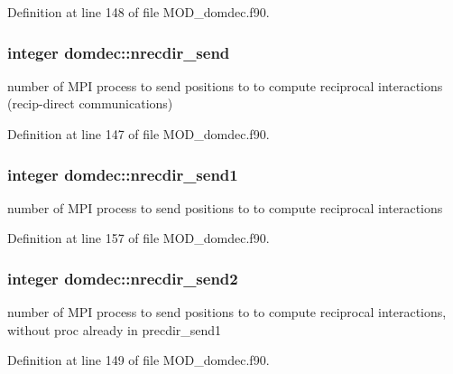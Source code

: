 Definition at line 148 of file M\-O\-D\-\_\-domdec.\-f90.

\hypertarget{classdomdec_ae3f9a9d0cf25f3d07550dd79ad9c84f8}{
\subsubsection[{nrecdir\-\_\-send}]{\setlength{\rightskip}{0pt plus 5cm}integer domdec\-::nrecdir\-\_\-send}}\label{classdomdec_ae3f9a9d0cf25f3d07550dd79ad9c84f8}


number of M\-P\-I process to send positions to to compute reciprocal interactions (recip-\/direct communications) 



Definition at line 147 of file M\-O\-D\-\_\-domdec.\-f90.

\hypertarget{classdomdec_a4dffa155fb7b24a0e90c0c94e7d4fdeb}{
\subsubsection[{nrecdir\-\_\-send1}]{\setlength{\rightskip}{0pt plus 5cm}integer domdec\-::nrecdir\-\_\-send1}}\label{classdomdec_a4dffa155fb7b24a0e90c0c94e7d4fdeb}


number of M\-P\-I process to send positions to to compute reciprocal interactions 



Definition at line 157 of file M\-O\-D\-\_\-domdec.\-f90.

\hypertarget{classdomdec_a399f832dbe50a87ea3cfd222b65eabfb}{
\subsubsection[{nrecdir\-\_\-send2}]{\setlength{\rightskip}{0pt plus 5cm}integer domdec\-::nrecdir\-\_\-send2}}\label{classdomdec_a399f832dbe50a87ea3cfd222b65eabfb}


number of M\-P\-I process to send positions to to compute reciprocal interactions, without proc already in precdir\-\_\-send1 



Definition at line 149 of file M\-O\-D\-\_\-domdec.\-f90.

